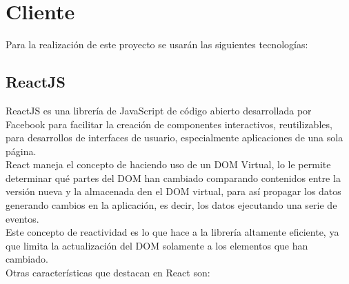 \section{Cliente}

Para la realización de este proyecto se usarán las siguientes tecnologías:

\subsection{ReactJS}

ReactJS es una librería de JavaScript de código abierto desarrollada por Facebook para facilitar la creación de componentes interactivos, reutilizables, para desarrollos de interfaces de usuario, especialmente aplicaciones de una sola página.\\

React maneja el concepto de  haciendo uso de un DOM Virtual, lo le permite determinar qué partes del DOM han cambiado comparando contenidos entre la versión nueva y la almacenada den el DOM virtual, para así propagar los datos generando cambios en la aplicación, es decir, los datos  ejecutando una serie de eventos.\\

Este concepto de reactividad es lo que hace a la librería altamente eficiente, ya que limita la actualización del DOM solamente a los elementos que han cambiado.\\

Otras características que destacan en React son:\\

